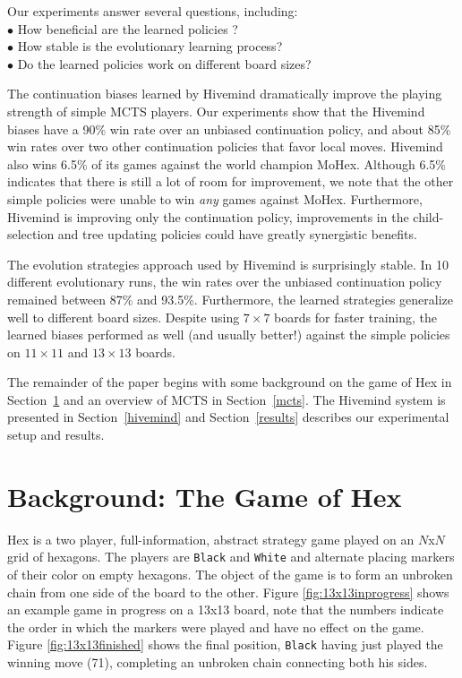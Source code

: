 \documentclass{acm_proc_article-sp}
\newcommand{\hblack}{\texttt{Black}}
\newcommand{\hwhite}{\texttt{White}}
\begin{document}
Our experiments answer several questions, including: \\
$\bullet$  How beneficial are the learned policies ?  \\
$\bullet$   How stable is the evolutionary learning process? \\
$\bullet$   Do the learned policies work on different board sizes?


The continuation biases learned by Hivemind dramatically improve the playing strength of simple MCTS players.
Our experiments show that the Hivemind biases have a 90\% win rate over an unbiased continuation policy,
and about 85\% win rates over two other continuation policies that favor local moves.  
Hivemind also wins 6.5\% of its games against the world champion MoHex.
Although 6.5\% indicates that there is still a lot of room for improvement, 
we note that the other simple policies were unable to win \emph{any} games against MoHex. 
Furthermore, Hivemind is improving only the continuation policy, 
improvements in the child-selection and tree updating policies could have greatly synergistic benefits.

The evolution strategies approach used by Hivemind is surprisingly stable.
In 10 different evolutionary runs, the win rates over the unbiased continuation policy remained
between 87\% and 93.5\%.  
Furthermore, the learned strategies generalize well to different board sizes.
Despite using $7 \times 7$ boards for faster training, 
the learned biases performed as well (and usually better!) against the simple policies on $11 \times 11$ and $13 \times 13$ boards.

The remainder of the paper begins with some background on the game of Hex in Section~\ref{s:hex} and
an overview of MCTS in Section~\ref{mcts}.
The Hivemind system is presented in Section~\ref{hivemind}
and Section~\ref{results} describes our experimental setup and results.




\section{Background: The Game of Hex}
\label{s:hex}
Hex is a two player, full-information, abstract strategy game played on an $N$x$N$ grid of hexagons. The players are \hblack{} and \hwhite{} and alternate placing markers of their color on empty hexagons. 
The object of the game is to form an unbroken chain from one side of the board to the other. 
Figure \ref{fig:13x13inprogress} shows an example game in progress on a 13x13 board, note that the numbers indicate
the order in which the markers were played and have no effect on the game.
Figure \ref{fig:13x13finished} shows the final position, \hblack{} having just played the winning move (71), completing an unbroken chain connecting both his sides. 
\end{document}
